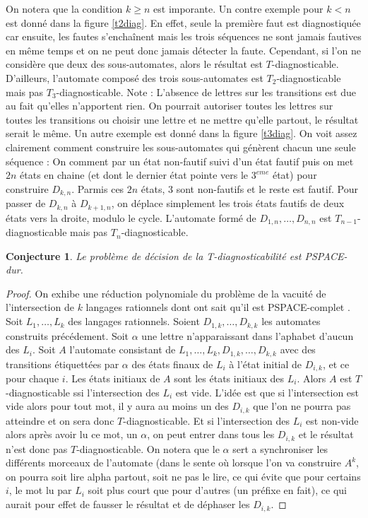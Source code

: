 \documentclass[conference]{IEEEtran}
\newtheorem{myconj}{Conjecture}
\begin{document}
On notera que la condition $k\ge n$ est imporante. Un contre exemple pour $k<n$ est donné dans la figure \ref{t2diag}. En effet, seule la première faut est diagnostiquée car ensuite, les fautes s'enchaînent mais les trois séquences ne sont jamais fautives en même temps et on ne peut donc jamais détecter la faute. Cependant, si l'on ne considère que deux des sous-automates, alors le résultat est $T$-diagnosticable. D'ailleurs, l'automate composé des trois sous-automates est $T_2$-diagnosticable mais pas $T_3$-diagnosticable. Note : L'absence de lettres sur les transitions est due au fait qu'elles n'apportent rien. On pourrait autoriser toutes les lettres sur toutes les transitions ou choisir une lettre et ne mettre qu'elle partout, le résultat serait le même. Un autre exemple est donné dans la figure \ref{t3diag}. On voit assez clairement comment construire les sous-automates qui génèrent chacun une seule séquence : On comment par un état non-fautif suivi d'un état fautif puis on met $2n$ états en chaine (et dont le dernier état pointe vers le $3^{eme}$ état) pour construire $D_{k,n}$. Parmis ces $2n$ états, $3$ sont non-fautifs et le reste est fautif. Pour passer de $D_{k,n}$ à $D_{k+1,n}$, on déplace simplement les trois états fautifs de deux états vers la droite, modulo le cycle. L'automate formé de $D_{1,n},\dots,D_{n,n}$ est $T_{n-1}$-diagnosticable mais pas $T_n$-diagnosticable.

\begin{myconj}
Le problème de décision de la T-diagnosticabilité est PSPACE-dur.
\end{myconj}

\begin{proof}
On exhibe une réduction polynomiale du problème de la vacuité de l'intersection de $k$ langages rationnels dont ont sait qu'il est PSPACE-complet \cite{Lange92theemptiness}. Soit $L_1, \dots, L_k$ des langages rationnels. Soient $D_{1,k},\dots, D_{k,k}$ les automates construits précédement. Soit $\alpha$ une lettre n'apparaissant dans l'aphabet d'aucun des $L_i$. Soit $A$ l'automate consistant de $L_1, \dots, L_k, D_{1,k},\dots, D_{k,k}$ avec des transitions étiquettées par $\alpha$ des états finaux de $L_i$ à l'état initial de $D_{i,k}$, et ce pour chaque $i$. Les états initiaux de $A$ sont les états initiaux des $L_i$. Alors $A$ est $T$-diagnosticable ssi l'intersection des $L_i$ est vide. L'idée est que si l'intersection est vide alors pour tout mot, il y aura au moins un des $D_{i,k}$ que l'on ne pourra pas atteindre et on sera donc $T$-diagnosticable. Et si l'intersection des $L_i$ est non-vide alors après avoir lu ce mot, un $\alpha$, on peut entrer dans tous les $D_{i,k}$ et le résultat n'est donc pas $T$-diagnosticable. On notera que le $\alpha$ sert a synchroniser les différents morceaux de l'automate (dans le sente où lorsque l'on va construire $A^k$, on pourra soit lire alpha partout, soit ne pas le lire, ce qui évite que pour certains $i$, le mot lu par $L_i$ soit plus court que pour d'autres (un préfixe en fait), ce qui aurait pour effet de fausser le résultat et de déphaser les $D_{i,k}$.
\end{proof}
\end{document}

